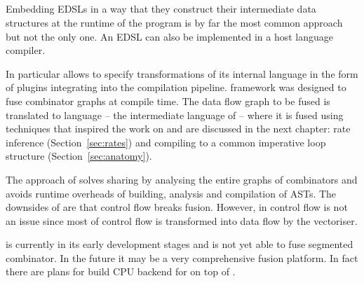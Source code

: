 \documentclass[preamble.tex]{subfiles}
\begin{document}
\subsection{\FlowFusion}
\label{sec:Fronted-FlowFusion}

Embedding EDSLs in a way that they construct their intermediate data structures at the runtime of the program is by far the most common approach but not the only one. An EDSL can also be implemented in a host language compiler.

In particular \GHC allows to specify transformations of its internal  language in the form of plugins integrating into the compilation pipeline. \FlowFusion framework \cite{FlowFusion, FusingFiltersILP} was designed to fuse combinator graphs at compile time. The data flow graph to be fused is translated to  language -- the intermediate language of  \cite{DDC} -- where it is fused using  techniques that inspired the work on \LiveFusion and are discussed in the next chapter: rate inference (Section~\ref{sec:rates}) and compiling to a common imperative loop structure (Section~\ref{sec:anatomy}).

The approach of \FlowFusion solves sharing by analysing the entire graphs of combinators and avoids runtime overheads of building, analysis and compilation of ASTs. The downsides of \FlowFusion are that control flow breaks fusion. However, in \DPH control flow is not an issue since most of control flow is transformed into data flow by the vectoriser.

\FlowFusion is currently in its early development stages and is not yet able to fuse segmented combinator. In the future it may be a very comprehensive fusion platform. In fact there are plans for build CPU backend for \Accelerate on top of \FlowFusion.
\end{document}
